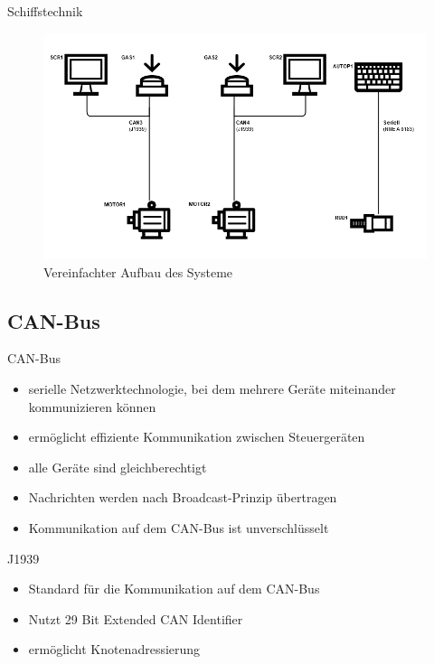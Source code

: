 \documentclass[usenames, dvipsnames, aspectratio=75]{beamer}
\begin{document}
\begin{frame}{Schiffstechnik}
    \begin{figure}
        \centering
        \includegraphics[width=1\linewidth]{assets/limanda_system.png}
        \caption{Vereinfachter Aufbau des Systeme}
    \end{figure}
\end{frame}

\subsection{CAN-Bus}
\begin{frame}{CAN-Bus}
    \begin{itemize}
        \item serielle Netzwerktechnologie, bei dem mehrere Geräte miteinander kommunizieren können
        \item ermöglicht effiziente Kommunikation zwischen Steuergeräten
        \item alle Geräte sind gleichberechtigt
        \item Nachrichten werden nach Broadcast-Prinzip übertragen
        \item Kommunikation auf dem CAN-Bus ist unverschlüsselt
    \end{itemize}
\end{frame}

\begin{frame}{J1939}
    \begin{itemize}
        \item Standard für die Kommunikation auf dem CAN-Bus
        \item Nutzt 29 Bit Extended CAN Identifier
        \item ermöglicht Knotenadressierung
    \end{itemize}
\end{frame}
\end{document}
